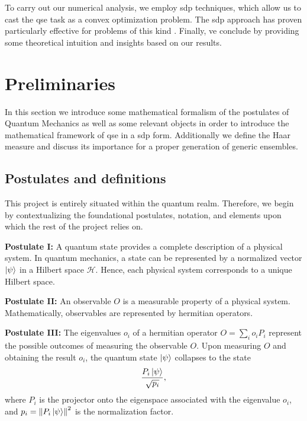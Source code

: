 \documentclass[12pt,letterpaper]{article}
\begin{document}
To carry out our numerical analysis, we employ \gls{sdp} techniques, which allow us to cast the \gls{qse} task as a convex optimization problem. The \gls{sdp} approach has proven particularly effective for problems of this kind \cite{bandyopadhyay2014conclusive}. Finally, ve conclude by providing some theoretical intuition and insights based on our results.

\newpage
\section{Preliminaries}

In this section we introduce some mathematical formalism of the postulates of Quantum Mechanics as well as some relevant objects in order to introduce the mathematical framework of \gls{qse} in a \gls{sdp} form. Additionally we define the Haar measure and discuss its importance for a proper generation of generic ensembles.

\subsection{Postulates and definitions}

This project is entirely situated within the quantum realm. Therefore, we begin by contextualizing the foundational postulates, notation, and elements upon which the rest of the project relies on.

\textbf{Postulate I:} A quantum state provides a complete description of a physical system. In quantum mechanics, a state can be represented by a normalized vector $\ket{\psi}$ in a Hilbert space $\mathcal{H}$. Hence, each physical system corresponds to a unique Hilbert space.

\textbf{Postulate II:} An observable $O$ is a measurable property of a physical system. Mathematically, observables are represented by hermitian operators.

\textbf{Postulate III:} The eigenvalues $o_i$ of a hermitian operator $O = \sum_{i} o_i P_i$ represent the possible outcomes of measuring the observable $O$. Upon measuring $O$ and obtaining the result $o_i$, the quantum state $\ket{\psi}$ collapses to the state
\begin{align*}
	\frac{P_i\ket{\psi}}{\sqrt{p_i}},
\end{align*}
where $P_i$ is the projector onto the eigenspace associated with the eigenvalue $o_i$, and $p_i = \left\|P_i\ket{\psi}\right\|^2$ is the normalization factor.
\end{document}
